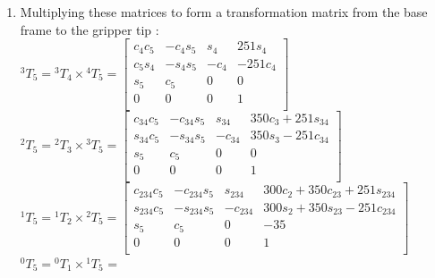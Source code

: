 \documentclass[12pt, a4paper]{article}
\begin{document}
\newpage
{}
\begin{enumerate}[(1)]

\item
Multiplying these matrices to form a transformation matrix from the base frame to the gripper tip : \\
${ }^{3} T_{5} = { }^{3} T_{4} \times { }^{4} T_{5} = 
\begin{bmatrix}
c_4 c_5 & -c_4  s_5 & s_4 & 251 s_4 \\
c_5 s_4 & -s_4  s_5 & -c_4 & -251 c_4 \\
s_5 & c_5 & 0 & 0 \\
0 & 0 & 0 & 1 \\
\end{bmatrix}$ 
\\
${ }^{2} T_{5} = { }^{2} T_{3} \times { }^{3} T_{5} = 
\begin{bmatrix}
c_{34} c_5 & -c_{34}  s_5 & s_{34} & 350 c_3 + 251 s_{34} \\
s_{34} c_5 & -s_{34}  s_5 & -c_{34} & 350 s_3 - 251 c_{34} \\
s_5 & c_5 & 0 & 0 \\
0 & 0 & 0 & 1 \\
\end{bmatrix}$
\\
${ }^{1} T_{5} = { }^{1} T_{2} \times { }^{2} T_{5} = 
\begin{bmatrix}
c_{234}c_5 & -c_{234}s_5 & s_{234} & 300c_2+350c_{23}+251s_{234} \\
s_{234}c_5 & -s_{234}s_5 & -c_{234} & 300s_2+350s_{23}-251c_{234} \\
s_5 & c_5 & 0 & -35 \\
0 & 0 & 0 & 1 \\
\end{bmatrix}
$ 
\\
${ }^{0} T_{5} = { }^{0} T_{1} \times { }^{1} T_{5}$ = \\


\end{enumerate}
\end{document}
